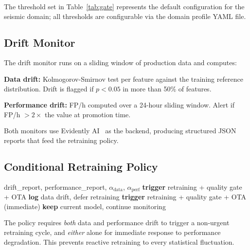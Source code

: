 \documentclass[conference]{IEEEtran}
\begin{document}
The threshold set in Table~\ref{tab:gate} represents the default
configuration for the seismic domain; all thresholds are configurable
via the domain profile YAML file.

\subsection{Drift Monitor}

The drift monitor runs on a sliding window of production data and computes:

\textbf{Data drift:} Kolmogorov-Smirnov test per feature against the
training reference distribution.
Drift is flagged if $p < 0.05$ in more than 50\% of features.

\textbf{Performance drift:} FP/h computed over a 24-hour sliding window.
Alert if FP/h $> 2\times$ the value at promotion time.

Both monitors use Evidently AI~\cite{evidentlyai} as the backend,
producing structured JSON reports that feed the retraining policy.

\subsection{Conditional Retraining Policy}

\begin{algorithm}
\caption{Conditional Retraining Policy}
\label{alg:retrain}
\begin{algorithmic}[1]
\REQUIRE drift\_report, performance\_report, $\alpha_\text{data}$, $\alpha_\text{perf}$
    \STATE \textbf{trigger} retraining + quality gate + OTA
  \ELSE
    \STATE \textbf{log} data drift, defer retraining
  \ENDIF
{}
  \STATE \textbf{trigger} retraining + quality gate + OTA (immediate)
\ELSE
  \STATE \textbf{keep} current model, continue monitoring
\ENDIF
\end{algorithmic}
\end{algorithm}

The policy requires \emph{both} data and performance drift to trigger
a non-urgent retraining cycle, and \emph{either} alone for immediate
response to performance degradation.
This prevents reactive retraining to every statistical fluctuation.

\end{document}
